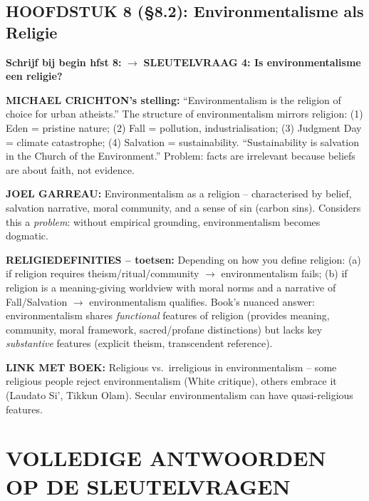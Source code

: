 \documentclass[a4paper,10pt]{article}
\begin{document}
\vspace{3pt}

\subsection{HOOFDSTUK 8 (§8.2): Environmentalisme als Religie}

\textbf{Schrijf bij begin hfst 8:} $\to$ \textbf{SLEUTELVRAAG 4: Is environmentalisme een religie?}

\textbf{MICHAEL CRICHTON's stelling:} ``Environmentalism is the religion of choice for urban atheists.'' The structure of environmentalism mirrors religion: (1) Eden = pristine nature; (2) Fall = pollution, industrialisation; (3) Judgment Day = climate catastrophe; (4) Salvation = sustainability. ``Sustainability is salvation in the Church of the Environment.'' Problem: facts are irrelevant because beliefs are about faith, not evidence.

\textbf{JOEL GARREAU:} Environmentalism as a religion -- characterised by belief, salvation narrative, moral community, and a sense of sin (carbon sins). Considers this a \textit{problem}: without empirical grounding, environmentalism becomes dogmatic.

\textbf{RELIGIEDEFINITIES -- toetsen:} Depending on how you define religion: (a) if religion requires theism/ritual/community $\to$ environmentalism fails; (b) if religion is a meaning-giving worldview with moral norms and a narrative of Fall/Salvation $\to$ environmentalism qualifies. Book's nuanced answer: environmentalism shares \textit{functional} features of religion (provides meaning, community, moral framework, sacred/profane distinctions) but lacks key \textit{substantive} features (explicit theism, transcendent reference).

\textbf{LINK MET BOEK:} Religious vs.\ irreligious in environmentalism -- some religious people reject environmentalism (White critique), others embrace it (Laudato Si', Tikkun Olam). Secular environmentalism can have quasi-religious features.

\vspace{8pt}

\section{VOLLEDIGE ANTWOORDEN OP DE SLEUTELVRAGEN}
\end{document}
